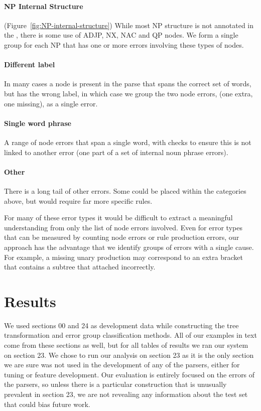 \paragraph{NP Internal Structure} (Figure~\ref{fig:NP-internal-structure}) 
While most NP structure is not annotated in the \ptb, there is some use of ADJP, NX, NAC and QP nodes.
We form a single group for each NP that has one or more errors involving these types of nodes.

\paragraph{Different label}
In many cases a node is present in the parse that spans the correct set of words, but has the wrong label, in which case we group the two node errors, (one extra, one missing), as a single error.

\paragraph{Single word phrase}
A range of node errors that span a single word, with checks to ensure this is not linked to another error (\myeg one part of a set of internal noun phrase errors).

\paragraph{Other}
There is a long tail of other errors.
Some could be placed within the categories above, but would require far more specific rules.

For many of these error types it would be difficult to extract a meaningful understanding from only the list of node errors involved.
Even for error types that can be measured by counting node errors or rule production errors, our approach has the advantage that we identify groups of errors with a single cause.
For example, a missing unary production may correspond to an extra bracket that contains a subtree that attached incorrectly.

\section{Results}

We used sections 00 and 24 as development data while constructing the tree transformation and error group classification methods.
All of our examples in text come from these sections as well, but for all tables of results we ran our system on section 23.
We chose to run our analysis on section 23 as it is the only section we are sure was not used in the development of any of the parsers, either for tuning or feature development.
Our evaluation is entirely focused on the errors of the parsers, so unless there is a particular construction that is unusually prevalent in section 23, we are not revealing any information about the test set that could bias future work.

